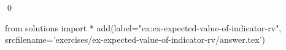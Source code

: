 
\begin{ex} 
  \label{ex:ex-expected-value-of-indicator-rv}
  
  \qed
\end{ex} 
\begin{python0}
from solutions import *
add(label="ex:ex-expected-value-of-indicator-rv",
    srcfilename='exercises/ex-expected-value-of-indicator-rv/answer.tex') 
\end{python0}

